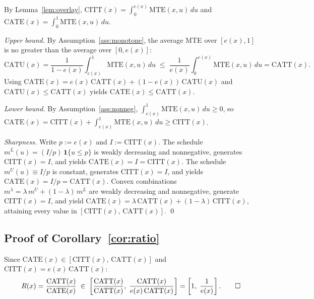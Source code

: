 \documentclass[11pt]{article}
\begin{document}
By Lemma~\ref{lem:overlay},
$\mathrm{CITT}(x) = \int_0^{e(x)}\mathrm{MTE}(x,u)\,du$ and
$\mathrm{CATE}(x) = \int_0^1 \mathrm{MTE}(x,u)\,du$.

\textit{Upper bound.}  By Assumption~\ref{ass:monotone}, the average MTE over
$[e(x),1]$ is no greater than the average over $[0,e(x)]$:
\[
  \mathrm{CATU}(x) = \frac{1}{1-e(x)}\int_{e(x)}^1\!\mathrm{MTE}(x,u)\,du
  \;\leq\; \frac{1}{e(x)}\int_0^{e(x)}\!\mathrm{MTE}(x,u)\,du = \mathrm{CATT}(x).
\]
Using $\mathrm{CATE}(x) = e(x)\,\mathrm{CATT}(x) + (1-e(x))\,\mathrm{CATU}(x)$
and $\mathrm{CATU}(x) \leq \mathrm{CATT}(x)$ yields $\mathrm{CATE}(x) \leq
\mathrm{CATT}(x)$.

\textit{Lower bound.}  By Assumption~\ref{ass:nonneg},
$\int_{e(x)}^1\mathrm{MTE}(x,u)\,du \geq 0$, so
$\mathrm{CATE}(x) = \mathrm{CITT}(x) + \int_{e(x)}^1\mathrm{MTE}(x,u)\,du
\geq \mathrm{CITT}(x)$.

\textit{Sharpness.}  Write $p := e(x)$ and $I := \mathrm{CITT}(x)$.  The
schedule $m^L(u) = (I/p)\,\mathbf{1}\{u \leq p\}$ is weakly decreasing and
nonnegative, generates $\mathrm{CITT}(x) = I$, and yields $\mathrm{CATE}(x) = I =
\mathrm{CITT}(x)$.  The schedule $m^U(u) \equiv I/p$ is constant, generates
$\mathrm{CITT}(x) = I$, and yields $\mathrm{CATE}(x) = I/p = \mathrm{CATT}(x)$.
Convex combinations $m^\lambda = \lambda\,m^U + (1-\lambda)\,m^L$ are weakly
decreasing and nonnegative, generate $\mathrm{CITT}(x) = I$, and yield
$\mathrm{CATE}(x) = \lambda\,\mathrm{CATT}(x) + (1-\lambda)\,\mathrm{CITT}(x)$,
attaining every value in $[\mathrm{CITT}(x),\, \mathrm{CATT}(x)]$. \qed

\subsection*{Proof of Corollary~\ref{cor:ratio}}

Since $\mathrm{CATE}(x) \in [\mathrm{CITT}(x),\, \mathrm{CATT}(x)]$ and
$\mathrm{CITT}(x) = e(x)\,\mathrm{CATT}(x)$:
\[
  R(x) = \frac{\mathrm{CATT}(x)}{\mathrm{CATE}(x)}
  \;\in\; \left[\frac{\mathrm{CATT}(x)}{\mathrm{CATT}(x)},\;
               \frac{\mathrm{CATT}(x)}{e(x)\,\mathrm{CATT}(x)}\right]
  = \left[1,\;\frac{1}{e(x)}\right]. \qed
\]



\end{document}
